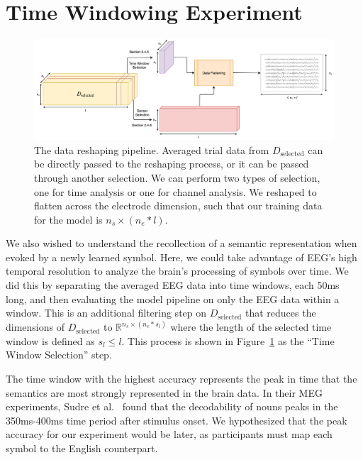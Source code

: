 \section{Time Windowing Experiment}
\begin{figure}[t]
  \centerline{
    \includegraphics[width=\linewidth]{figures/reshape}
  }
  \caption{The data reshaping pipeline. Averaged trial data from $D_{\text{selected}}$ can be directly passed to the reshaping process, or it can be passed through another selection. We can perform two types of selection, one for time analysis or one for channel analysis. We reshaped to flatten across the electrode dimension, such that our training data for the model is $n_s \times (n_e * l)$.}
  \label{fig:reshape}
\end{figure}

We also wished to understand the recollection of a semantic representation when evoked by a newly learned symbol. Here, we could take advantage of EEG's high temporal resolution to analyze the brain's processing of symbols over time. We did this by separating the averaged EEG data into time windows, each 50ms long, and then evaluating the model pipeline on only the EEG data within a window. This is an additional filtering step on $D_{\text{selected}}$ that reduces the dimensions of $D_\text{selected}$ to $\mathbb{R}^{n_s \times (n_e * s_l)}$ where the length of the selected time window is defined as $s_l \leq l$. This process is shown in Figure~\ref{fig:reshape} as the ``Time Window Selection'' step. 

The time window with the highest accuracy represents the peak in time that the semantics are most strongly represented in the brain data. In their MEG experiments, Sudre et al.~\cite{Sudre2012} found that the decodability of nouns peaks in the 350ms-400ms time period after stimulus onset. We hypothesized that the peak accuracy for our experiment would be later, as participants must map each symbol to the English counterpart.
